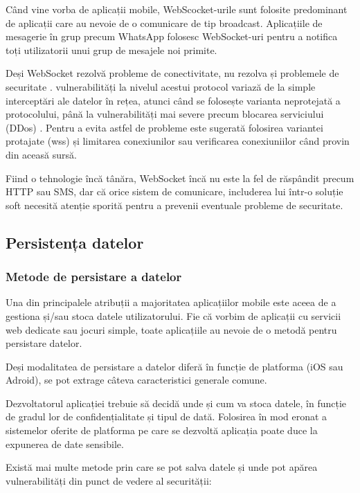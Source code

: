 \documentclass[12pt]{article}
\begin{document}
Când vine vorba de aplicații mobile, WebScocket-urile sunt folosite
predominant de aplicații care au nevoie de o comunicare de tip broadcast. 
Aplicațiile de mesagerie în grup precum WhatsApp folosesc WebSocket-uri pentru
a notifica toți utilizatorii unui grup de mesajele noi primite.

Deși WebSocket rezolvă probleme de conectivitate, nu rezolva și problemele de 
securitate \cite{erkkila2012websocket}. vulnerabilități la nivelul acestui protocol
variază de la simple interceptări ale datelor în rețea, atunci când se folosește varianta
neprotejată a protocolului, până la vulnerabilități mai severe precum blocarea serviciului
(DDos) \cite{test-ws}. Pentru a evita astfel de probleme este sugerată folosirea variantei
protajate (wss) și limitarea conexiunilor sau verificarea conexiuniilor când provin din aceasă sursă.


Fiind o tehnologie încă tânăra, WebSocket încă nu este la fel de răspândit
precum HTTP sau SMS, dar că orice sistem de comunicare, includerea lui într-o
soluție soft necesită atenție sporită pentru a prevenii eventuale probleme de securitate.


\newpage
\subsection{Persistența datelor}
\subsubsection{Metode de persistare a datelor}

Una din principalele atribuții a majoritatea aplicațiilor mobile
este aceea de a gestiona și/sau stoca datele utilizatorului. Fie că 
vorbim de aplicații cu servicii web dedicate sau jocuri simple, toate aplicațiile
au nevoie de o metodă pentru persistare datelor. 

Deși modalitatea de persistare a datelor diferă în funcție de platforma
(iOS sau Adroid), se pot extrage câteva caracteristici generale comune.

Dezvoltatorul aplicației trebuie să decidă unde și cum va stoca datele,
în funcție de gradul lor de confidențialitate și tipul de dată. Folosirea
în mod eronat a sistemelor oferite de platforma pe care se dezvoltă aplicația
poate duce la expunerea de date sensibile.

Există mai multe metode prin care se pot salva datele și unde pot apărea
vulnerabilități din punct de vedere al securității:
\end{document}
